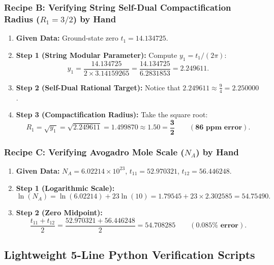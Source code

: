 \documentclass[11pt,a4paper]{article}
\begin{document}
\subsubsection{Recipe B: Verifying String Self-Dual Compactification Radius (\texorpdfstring{$R_1 = 3/2$}{R_1 = 3/2}) by Hand}
\begin{enumerate}
    \item \textbf{Given Data:} Ground-state zero $t_1 = 14.134725$.
    \item \textbf{Step 1 (String Modular Parameter):} Compute $y_1 = t_1 / (2\pi)$:
    \begin{equation}
    y_1 = \frac{14.134725}{2 \times 3.14159265} = \frac{14.134725}{6.2831853} = \mathbf{2.249611}.
    \end{equation}
    \item \textbf{Step 2 (Self-Dual Rational Target):} Notice that $2.249611 \approx \frac{9}{4} = 2.250000$.
    \item \textbf{Step 3 (Compactification Radius):} Take the square root:
    \begin{equation}
    R_1 = \sqrt{y_1} = \sqrt{2.249611} = \mathbf{1.499870} \approx \mathbf{1.50 = \frac{3}{2}} \qquad (\mathbf{86 \text{ ppm error}}).
    \end{equation}
\end{enumerate}

\subsubsection{Recipe C: Verifying Avogadro Mole Scale (\texorpdfstring{$N_A$}{N_A}) by Hand}
\begin{enumerate}
    \item \textbf{Given Data:} $N_A = 6.02214 \times 10^{23}$, $t_{11} = 52.970321$, $t_{12} = 56.446248$.
    \item \textbf{Step 1 (Logarithmic Scale):}
    \begin{equation}
    \ln(N_A) = \ln(6.02214) + 23 \ln(10) = 1.79545 + 23 \times 2.302585 = \mathbf{54.75490}.
    \end{equation}
    \item \textbf{Step 2 (Zero Midpoint):}
    \begin{equation}
    \frac{t_{11} + t_{12}}{2} = \frac{52.970321 + 56.446248}{2} = \mathbf{54.708285} \qquad (\mathbf{0.085\% \text{ error}}).
    \end{equation}
\end{enumerate}

\subsection{Lightweight 5-Line Python Verification Scripts}
\end{document}
